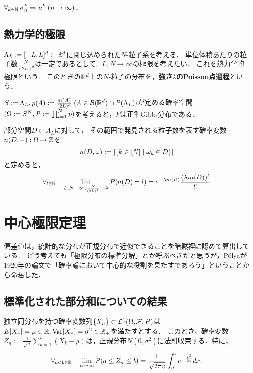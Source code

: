\documentclass[uplatex,dvipdfmx]{jsreport}
\begin{document}
\begin{theorem}
    $\forall_{k\in\mathbb{N}}\;\sigma^k_n\Rightarrow\mu^k\;(n\to\infty)$．
\end{theorem}

\subsection{熱力学的極限}

\begin{notation}
    $\Lambda_L:=[-L,L]^d\subset\mathbb{R}^d$に閉じ込められた$N$-粒子系を考える．
    単位体積あたりの粒子数$\frac{N}{(2L)^d}$は一定であるとして，$L,N\to\infty$の極限を考えたい．
    これを熱力学的極限という．
    このときの$\mathbb{R}^d$上の$N$-粒子の分布を，\textbf{強さ$\lambda$のPoisson点過程}という．

    $S:=\Lambda_L,p(A):=\frac{m(A)}{(2L)^d}\;(A\in\mathcal{B}(\mathbb{R}^d)\cap P(\Lambda_L))$が定める確率空間$(\Omega:=S^N,P:=\prod_{i=1}^Np)$を考えると，$P$は正準Gibbs分布である．
\end{notation}

\begin{theorem}
    部分空間$D\subset\Lambda_L$に対して，
    その範囲で発見される粒子数を表す確率変数$n(D,-):\Omega\to\mathbb{Z}$を
    \[n(D,\omega):=\left|\left\{k\in[N]\mid\omega_k\in D\right\}\right|\]
    と定めると，
    \[\forall_{l\in\mathbb{N}}\quad\lim_{L,N\to\infty,\frac{N}{(2L)^d}\to\lambda}P(n(D)=l)=e^{-\lambda m(D)}\frac{(\lambda m(D))^l}{l!}\]
\end{theorem}

\section{中心極限定理}

\begin{tcolorbox}[colframe=ForestGreen, colback=ForestGreen!10!white,breakable,colbacktitle=ForestGreen!40!white,coltitle=black,fonttitle=\bfseries\sffamily,
title=]
    偏差値は，統計的な分布が正規分布で近似できることを暗黙裡に認めて算出している．
    どう考えても「極限分布の標準分解」とか呼ぶべきだと思うが，Pólyaが1920年の論文で「確率論において中心的な役割を果たすであろう」ということから命名した．
\end{tcolorbox}

\subsection{標準化された部分和についての結果}

\begin{theorem}
    独立同分布を持つ確率変数列$\{X_n\}\subset\mathcal{L}^1(\Omega,\mathcal{F},P)$は$E[X_n]=\mu\in\mathbb{R},\mathrm{Var}[X_n]=\sigma^2\in\mathbb{R}_+$を満たすとする．
    このとき，確率変数$Z_n:=\frac{1}{\sqrt{n}}\sum^n_{k=1}(X_k-\mu)$は，正規分布$N(0,\sigma^2)$に法則収束する．特に，
    \[\forall_{a<b\in\mathbb{R}}\quad\lim_{n\to\infty}P(a\le Z_n\le b)=\frac{1}{\sqrt{2\pi v}}\int^b_ae^{-\frac{x^2}{2v}}dx.\]
\end{theorem}
\end{document}
